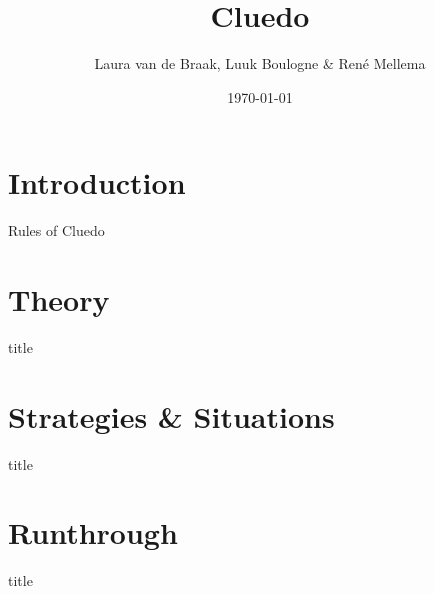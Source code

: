 \documentclass{beamer}
\title{Cluedo}
\author{Laura van de Braak, Luuk Boulogne \& Ren\'e Mellema}
\date{\today}
\begin{document}
\begin{frame}
    \titlepage
\end{frame}

\begin{frame}[Content]
  \tableofcontents
\end{frame}

\section{Introduction}

\begin{frame}{Rules of Cluedo}
  
\end{frame}

\section{Theory}

\begin{frame}{title}

\end{frame}

\section{Strategies \& Situations}

\begin{frame}{title}

\end{frame}

\section{Runthrough}

\begin{frame}{title}

\end{frame}
\end{document}
